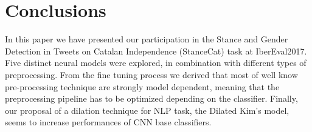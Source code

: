 \section{Conclusions} \label{sec:conclusion}

In this paper we have presented our participation in the Stance and Gender Detection in Tweets on Catalan Independence (StanceCat) task at IberEval2017.
Five distinct neural models were explored, in combination with different types of preprocessing.
From the fine tuning process we derived that most of well know pre-processing technique are strongly model dependent, meaning that the preprocessing pipeline has to be optimized depending on the classifier.
Finally, our proposal of a dilation technique for NLP task, the Dilated Kim's model, seems to increase performances of CNN base classifiers.
